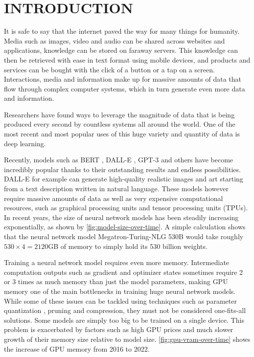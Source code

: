 
\chapter{INTRODUCTION}\label{chapter:introduction}

It is safe to say that the internet paved the way for many things for humanity.
Media such as images, video and audio can be shared across websites and applications, knowledge can be stored on faraway servers.
This knowledge can then be retrieved with ease in text format using mobile devices, and products and services can be bought with the click of a button or a tap on a screen.
Interactions, media and information make up for massive amounts of data that flow through complex computer systems, which in turn generate even more data and information.

Researchers have found ways to leverage the magnitude of data that is being produced every second by countless systems all around the world.
One of the most recent and most popular uses of this huge variety and quantity of data is deep learning.

Recently, models such as BERT \cite{devlin2018bert}, DALL-E \cite{ramesh2021zero}, GPT-3 \cite{brown2020gpt3} and others have become incredibly popular thanks to their outstanding results and endless possibilities.
DALL-E for example can generate high-quality realistic images and art starting from a text description written in natural language.
These models however require massive amounts of data as well as very expensive computational resources, such as graphical processing units and tensor processing units (TPUs).
In recent years, the size of neural network models has been steadily increasing exponentially, as shown by \autoref{fig:model-size-over-time}.
A simple calculation shows that the neural network model Megatron-Turing-NLG 530B \cite{smith2022megatronturingnlg} would take roughly $530 \times 4 = 2120$GB of memory to simply hold its 530 billion weights.

Training a neural network model requires even more memory.
Intermediate computation outputs such as gradient and optimizer states sometimes require 2 or 3 times as much memory than just the model parameters, making GPU memory one of the main bottlenecks in training huge neural network models.
While some of these issues can be tackled using techniques such as parameter quantization \cite{DBLP:journals/corr/abs-2003-11316}, pruning and compression, they must not be considered one-fits-all solutions.
Some models are simply too big to be trained on a single device.
This problem is exacerbated by factors such as high GPU prices and much slower growth of their memory size relative to model size.
\autoref{fig:gpu-vram-over-time} shows the increase of GPU memory from 2016 to 2022.

